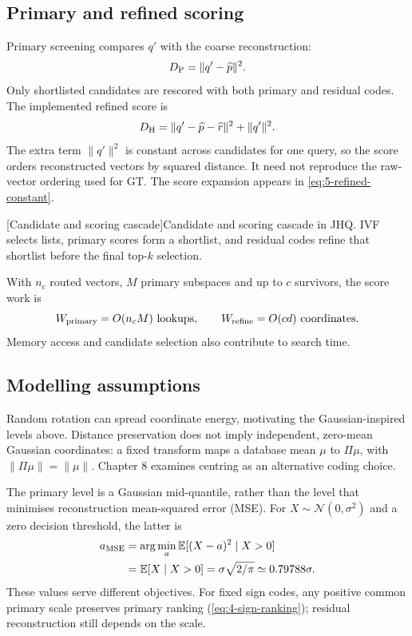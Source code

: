 \subsection{Primary and refined scoring}

Primary screening compares $q'$ with the coarse reconstruction:
\[
 D_{\mathrm{P}}=\|q'-\widehat p\|^2.
\]
Only shortlisted candidates are rescored with both primary and residual
codes. The implemented refined score is
\begin{equation}
 D_{\mathrm{H}}=\|q'-\widehat p-\widehat r\|^2+\|q'\|^2.
 \label{eq:2-refined}
\end{equation}
The extra term $\|q'\|^2$ is constant across candidates for one query,
so the score orders reconstructed vectors by squared distance. It need
not reproduce the raw-vector ordering used for GT. The score expansion
appears in \cref{eq:5-refined-constant}.

\par\medskip\noindent\begin{minipage}{\linewidth}
\centering\captionsetup{hypcap=false}
\resizebox{\linewidth}{!}{}
[Candidate and scoring cascade]{Candidate and scoring cascade in JHQ.
IVF selects lists, primary scores form a shortlist, and residual codes
refine that shortlist before the final top-$k$ selection.}
\label{fig:2-cascade}
\end{minipage}\par\medskip

With $n_c$ routed vectors, $M$ primary subspaces and up to $c$ survivors,
the score work is
\[
 W_{\rm primary}=O(n_cM)\ \text{lookups},\qquad
 W_{\rm refine}=O(cd)\ \text{coordinates}.
\]
Memory access and candidate selection also contribute to search time.

\subsection{Modelling assumptions}

Random rotation can spread coordinate energy, motivating the Gaussian-inspired
levels above. Distance preservation does not imply independent, zero-mean
Gaussian coordinates: a fixed transform maps a database mean $\mu$ to
$\Pi\mu$, with $\|\Pi\mu\|=\|\mu\|$. Chapter 8 examines centring as an
alternative coding choice.

The primary level is a Gaussian mid-quantile, rather than the level that
minimises reconstruction mean-squared error (MSE). For
$X\sim\mathcal N(0,\sigma^2)$ and a zero decision threshold, the latter is
\[
 \begin{aligned}
 a_{\rm MSE}
 &=\arg\min_a\mathbb E[(X-a)^2\mid X>0]\\
 &=\mathbb E[X\mid X>0]
 =\sigma\sqrt{2/\pi}\simeq0.79788\sigma.
 \end{aligned}
\]
These values serve different objectives. For fixed sign codes, any
positive common primary scale preserves primary ranking
(\cref{eq:4-sign-ranking}); residual reconstruction still depends on the
scale.
